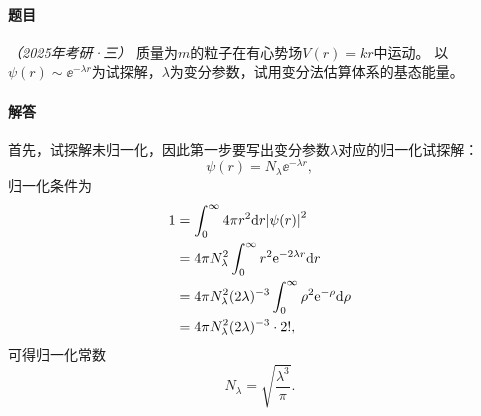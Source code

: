 \begin{tcolorbox}[breakable, title={\textbf{例题}}]
    \paragraph{题目} \textit{（2025年考研·三）}
    质量为$m$的粒子在有心势场$V(r)=kr$中运动。
    以$\psi(r)\sim\ee^{-\lambda r}$为试探解，$\lambda$为变分参数，试用变分法估算体系的基态能量。

    \paragraph{解答}

    首先，试探解未归一化，因此第一步要写出变分参数$\lambda$对应的归一化试探解：
    \begin{equation}
        \psi(r) = N_\lambda \ee^{-\lambda r},
    \end{equation}
    归一化条件为
    \begin{equation}
    \begin{aligned}
        1 &= \int_0^\infty 4\pi r^2 \dd r \abs{\psi(r)}^2 \\
        &= 4\pi N_\lambda^2 \int_0^\infty r^2 \mathrm{e}^{-2\lambda r} \dd r \\
        &= 4\pi N_\lambda^2 (2\lambda)^{-3} \int_0^\infty \rho^2 \mathrm{e}^{-\rho} \dd\rho \\
        &= 4\pi N_\lambda^2 (2\lambda)^{-3} \cdot 2!,
    \end{aligned}
    \end{equation}
    可得归一化常数
    \begin{equation}
        N_\lambda = \sqrt{\frac{\lambda^3}{\pi}}.
    \end{equation}


\end{tcolorbox}
